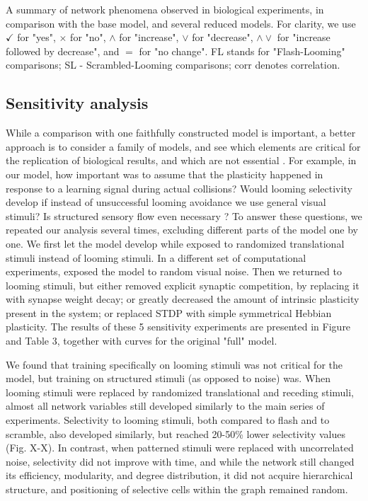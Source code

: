 \documentclass{article}
\begin{document}
\begin{table}
    
    \caption{A summary of network phenomena observed in biological experiments, in comparison with the base model, and several reduced models. For clarity, we use $\checkmark$ for "yes", $\times$ for "no", $\land$ for "increase", $\lor$ for "decrease", $\land \lor$ for "increase followed by decrease", and $=$ for "no change". FL stands for "Flash-Looming" comparisons; SL - Scrambled-Looming comparisons; corr denotes correlation.}
\end{table}

\subsection*{Sensitivity analysis}

While a comparison with one faithfully constructed model is important, a better approach is to consider a family of models, and see which elements are critical for the replication of biological results, and which are not essential \citep{linderman2017constrain,pauli2018repro}. For example, in our model, how important was to assume that the plasticity happened in response to a learning signal during actual collisions? Would  looming selectivity develop if instead of unsuccessful looming avoidance we use general visual stimuli? Is structured sensory flow even necessary \citep{triplett2018emergence}? To answer these questions, we repeated our analysis several times, excluding different parts of the model one by one. We first let the model develop while exposed to randomized translational stimuli instead of looming stimuli. In a different set of computational experiments, exposed the model to random visual noise. Then we returned to looming stimuli, but either removed explicit synaptic competition, by replacing it with synapse weight decay; or greatly decreased the amount of intrinsic plasticity present in the system; or replaced STDP with simple symmetrical Hebbian plasticity. The results of these 5 sensitivity experiments are presented in Figure and Table 3, together with curves for the original "full" model.

We found that training specifically on looming stimuli was not critical for the model, but training on structured stimuli (as opposed to noise) was. When looming stimuli were replaced by randomized translational and receding stimuli, almost all network variables still developed similarly to the main series of experiments. Selectivity to looming stimuli, both compared to flash and to scramble, also developed similarly, but reached 20-50\% lower selectivity values (Fig. X-X). In contrast, when patterned stimuli were replaced with uncorrelated noise, selectivity did not improve with time, and while the network still changed its efficiency, modularity, and degree distribution, it did not acquire hierarchical structure, and positioning of selective cells within the graph remained random.
\end{document}
